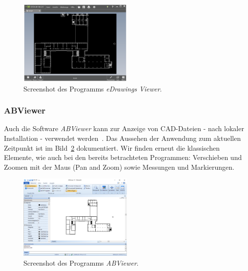 \begin{figure}
    \includegraphics[width=0.5\textwidth]{res/edrawings-viewer.png}
    \caption{Screenshot des Programms \textit{eDrawings Viewer}.}
    \label{fig:edrawings-viewer}
\end{figure}

\subsubsection{ABViewer}
\label{subsubsec:abviewer}

Auch die Software \textit{ABViewer} kann zur Anzeige von CAD-Dateien - nach lokaler Installation - verwendet werden~\cite{ABViewer}.
Das Aussehen der Anwendung zum aktuellen Zeitpunkt ist im Bild~\ref{fig:abviewer} dokumentiert.
Wir finden erneut die klassischen Elemente, wie auch bei den bereits betrachteten Programmen: Verschieben und Zoomen mit der Maus (Pan and Zoom) sowie Messungen und Markierungen.

\begin{figure}
    \includegraphics[width=0.5\textwidth]{res/abviewer.png}
    \caption{Screenshot des Programms \textit{ABViewer}.}
    \label{fig:abviewer}
\end{figure}
